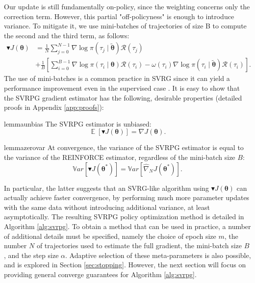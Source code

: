 \documentclass{article}
\theoremstyle{remark}
\theoremstyle{definition}
\newcommand{\vtheta}{\boldsymbol{\theta}}
\newcommand{\Reward}{\mathcal{R}}
\newcommand{\gradJ}[1]{\nabla J(#1)}
\newcommand{\gradApp}[2]{\widehat{\nabla}_{#2}J(#1)}
\newcommand{\gradBlack}[1]{\blacktriangledown J(#1)}
\begin{document}
Our update is still fundamentally on-policy, since the weighting concerns only the correction term. However, this partial "off-policyness" is enough to introduce variance. To mitigate it, we use mini-batches of trajectories of size B to compute the second and the third term, as follows:
\begin{align*}
\blacktriangledown J(\vtheta) &= \frac{1}{N}\sum_{j=0}^{N-1}\nabla\log\pi(\tau_j \mid \tilde{\vtheta})\Reward(\tau_j) \\
&+ \frac{1}{B}\left[\sum_{i=0}^{B-1}
\nabla\log\pi(\tau_i \mid \vtheta)\Reward(\tau_i) 
- \omega(\tau_i)\nabla\log\pi(\tau_i \mid \tilde{\vtheta})\Reward(\tau_i)\right].
\end{align*}
The use of mini-batches is a common practice in SVRG since it can yield a performance improvement even in the supervised case \cite{konevcny2016mini} \cite{harikandeh2015stopwasting}. It is easy to show that the SVRPG gradient estimator has the following, desirable properties (detailed proofs in Appendix \ref{app:proofs}):
\begin{restatable}{lemma}{unbias}\label{lemma:unbias}
The SVRPG estimator is unbiased:
\[
\mathop{\mathbb{E}}
\left[\blacktriangledown J(\vtheta)\right] = \gradJ{\vtheta}.
\]
\end{restatable}
\begin{restatable}{lemma}{zerovar}\label{lemma:zerovar}
At convergence, the variance of the SVRPG estimator is equal to the variance of the REINFORCE estimator, regardless of the mini-batch size $B$:
\[
	\mathbb{V}ar\left[\gradBlack{\vtheta^*}\right] = 
	\mathbb{V}ar\left[\gradApp{\vtheta^*}{N}\right].
\]
\end{restatable}
In particular, the latter suggests that an SVRG-like algorithm using $\gradBlack{\vtheta}$ can actually achieve faster convergence, by performing much more parameter updates with the same data without introducing additional variance, at least asymptotically.
The resulting SVRPG policy optimization method is detailed in Algorithm \ref{alg:svrpg}.
To obtain a method that can be used in practice, a number of additional details must be specified, namely the choice of epoch size $m$, the number $N$ of trajectories used to estimate the full gradient, the mini-batch size $B$, and the step size $\alpha$. Adaptive selection of these meta-parameters is also possible, and is explored in Section \ref{sec:stopping}. However, the next section will focus on providing general converge guarantees for Algorithm \ref{alg:svrpg}.
\end{document}

